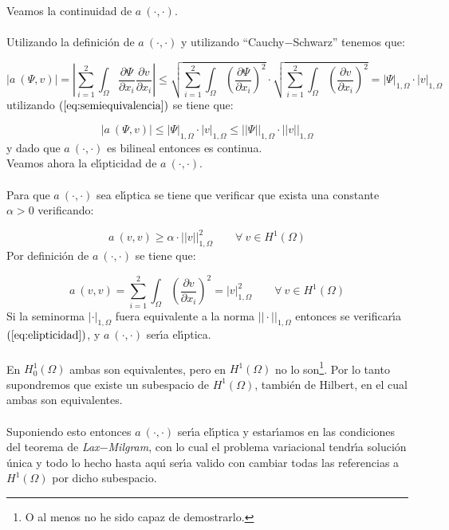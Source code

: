 \documentclass[a4paper,11pt]{article}
\begin{document}
\newpage

Veamos la continuidad de $a\ (\cdot ,\cdot )$.\\ \\
Utilizando la definici\'on de $a\ (\cdot ,\cdot )$ y utilizando
``Cauchy$-$Schwarz'' tenemos que:

\begin{displaymath}
|a\ (\Psi ,v)| = |\sum_{i=1}^2 \int_{\Omega }\frac{\partial \Psi}{\partial x_i}
\frac{\partial v}{\partial x_i}| \le \sqrt{\sum_{i=1}^2 \int_{\Omega }
(\frac{\partial \Psi}{\partial x_i})^2 }\cdot \sqrt{\sum_{i=1}^2\int_{\Omega }
(\frac{\partial v}{\partial x_i})^2} = |\Psi |_{1,\Omega }\cdot |v|_{1,\Omega }
\end{displaymath}
utilizando $(\ref{eq:semiequivalencia})$ se tiene que:

\begin{displaymath}
|a\ (\Psi ,v)| \le |\Psi |_{1,\Omega }\cdot |v|_{1,\Omega } \le
||\Psi ||_{1,\Omega }\cdot ||v||_{1,\Omega }
\end{displaymath}
y dado que $a\ (\cdot ,\cdot )$ es bilineal entonces es continua.\\ 

Veamos ahora la el\'{\i}pticidad de $a\ (\cdot ,\cdot)$.\\ \\
Para que $a\ (\cdot ,\cdot )$  sea el\'{\i}ptica se tiene que verificar que
exista una constante $\alpha > 0$ verificando:

\begin{equation} \label{eq:elipticidad}
a\ (v,v) \ge \alpha \cdot ||v||^2_{1,\Omega }\qquad \forall \ v \in H^1(\Omega )
\end{equation}
Por definici\'on de $a\ (\cdot ,\cdot )$ se tiene que:

\begin{displaymath}
a\ (v,v) = \sum_{i=1}^2 \int_{\Omega } (\frac{\partial v}{\partial x_i})^2 =
|v|^2_{1,\Omega }\qquad \forall \ v \in H^1(\Omega )
\end{displaymath}
Si la seminorma $|\cdot |_{1,\Omega}$ fuera equivalente a la norma
$||\cdot ||_{1,\Omega }$ entonces se verificar\'{\i}a $(\ref{eq:elipticidad})$,
y $a\ (\cdot ,\cdot )$ ser\'{\i}a el\'{\i}ptica.\\ \\
En $H^1_0 (\Omega )$ ambas son equivalentes, pero en $H^1 (\Omega )$ no lo
son\footnote{O al menos no he sido capaz de demostrarlo.}. Por lo tanto
supondremos que existe un subespacio de $H^1(\Omega )$, tambi\'en de Hilbert,
en el cual ambas son equivalentes.\\ \\
Suponiendo esto entonces $a\ (\cdot , \cdot )$ ser\'{\i}a el\'{\i}ptica y
estar\'{\i}amos en las condiciones del teorema de \emph{Lax$-$Milgram}, con lo
cual el problema variacional tendr\'{\i}a soluci\'on \'unica y todo lo hecho
hasta aqu\'{\i} ser\'{\i}a valido con cambiar todas las referencias a
$H^1(\Omega )$ por dicho subespacio.
\end{document}
